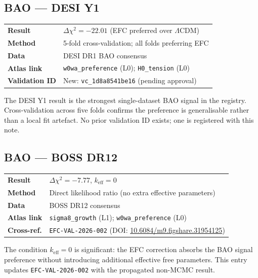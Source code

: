 \documentclass[11pt,a4paper]{article}
\begin{document}
\subsection{BAO --- DESI Y1}

\begin{tabular}{@{}lp{}@{}}
\textbf{Result} & $\Delta\chi^2 = -22.01$ (EFC preferred over $\Lambda$CDM) \\
\textbf{Method} & 5-fold cross-validation; all folds preferring EFC \\
\textbf{Data} & DESI DR1 BAO consensus \\
\textbf{Atlas link} & \texttt{w0wa\_preference} (L0); \texttt{H0\_tension} (L0) \\
\textbf{Validation ID} & New: \texttt{vc\_1d8a8541be16} (pending approval) \\
\end{tabular}

\vspace{4pt}
The DESI Y1 result is the strongest single-dataset BAO signal in the registry. Cross-validation across five folds confirms the preference is generalisable rather than a local fit artefact. No prior validation ID exists; one is registered with this note.

\subsection{BAO --- BOSS DR12}

\begin{tabular}{@{}lp{}@{}}
\textbf{Result} & $\Delta\chi^2 = -7.77$, $k_{\mathrm{eff}} = 0$ \\
\textbf{Method} & Direct likelihood ratio (no extra effective parameters) \\
\textbf{Data} & BOSS DR12 consensus \\
\textbf{Atlas link} & \texttt{sigma8\_growth} (L1); \texttt{w0wa\_preference} (L0) \\
\textbf{Cross-ref.} & \texttt{EFC-VAL-2026-002} (DOI: \href{https://doi.org/10.6084/m9.figshare.31954125}{10.6084/m9.figshare.31954125}) \\
\end{tabular}

\vspace{4pt}
The condition $k_{\mathrm{eff}} = 0$ is significant: the EFC correction absorbs the BAO signal preference without introducing additional effective free parameters. This entry updates \texttt{EFC-VAL-2026-002} with the propagated non-MCMC result.
\end{document}
